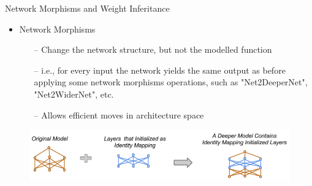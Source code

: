 \begin{frame}{Network Morphisms and Weight Inferitance}
    \begin{itemize}
    	\item \alert{Network Morphisms} 
	\begin{itemize}
		\item[--] Change the network structure, but not the modelled function
		\item[--] i.e., for every input the network yields the same output as before applying
		some network morphisms operations, such as "Net2DeeperNet", "Net2WiderNet", etc.
		\item[--] Allows efficient moves in architecture space
	\end{itemize}
    \end{itemize}

    \begin{figure}[t]
        \begin{centering}
            \includegraphics[scale=0.3]{images_lec7/net2deepernet.png}
        \end{centering}
    \end{figure}

\end{frame}

